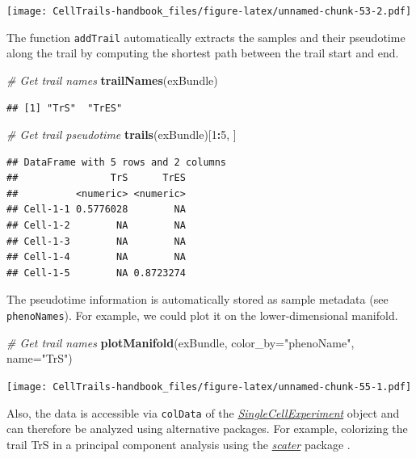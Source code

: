 \documentclass[]{book}
\newenvironment{Shaded}{\begin{snugshade}}{\end{snugshade}}
\newcommand{\KeywordTok}[1]{\textcolor[rgb]{0.13,0.29,0.53}{\textbf{#1}}}
\newcommand{\DataTypeTok}[1]{\textcolor[rgb]{0.13,0.29,0.53}{#1}}
\newcommand{\DecValTok}[1]{\textcolor[rgb]{0.00,0.00,0.81}{#1}}
\newcommand{\StringTok}[1]{\textcolor[rgb]{0.31,0.60,0.02}{#1}}
\newcommand{\CommentTok}[1]{\textcolor[rgb]{0.56,0.35,0.01}{\textit{#1}}}
\newcommand{\OperatorTok}[1]{\textcolor[rgb]{0.81,0.36,0.00}{\textbf{#1}}}
\newcommand{\NormalTok}[1]{#1}
\theoremstyle{definition}
\theoremstyle{definition}
\theoremstyle{definition}
\theoremstyle{remark}
\begin{document}
\texttt{[image: CellTrails-handbook\_files/figure-latex/unnamed-chunk-53-2.pdf]}

The function \texttt{addTrail} automatically extracts the samples and
their pseudotime along the trail by computing the shortest path between
the trail start and end.

\begin{Shaded}
\begin{Highlighting}[]
\CommentTok{# Get trail names}
\KeywordTok{trailNames}\NormalTok{(exBundle)}
\end{Highlighting}
\end{Shaded}

\begin{verbatim}
## [1] "TrS"  "TrES"
\end{verbatim}

\begin{Shaded}
\begin{Highlighting}[]
\CommentTok{# Get trail pseudotime}
\KeywordTok{trails}\NormalTok{(exBundle)[}\DecValTok{1}\OperatorTok{:}\DecValTok{5}\NormalTok{, ]}
\end{Highlighting}
\end{Shaded}

\begin{verbatim}
## DataFrame with 5 rows and 2 columns
##                TrS      TrES
##          <numeric> <numeric>
## Cell-1-1 0.5776028        NA
## Cell-1-2        NA        NA
## Cell-1-3        NA        NA
## Cell-1-4        NA        NA
## Cell-1-5        NA 0.8723274
\end{verbatim}

The pseudotime information is automatically stored as sample metadata
(see \texttt{phenoNames}). For example, we could plot it on the
lower-dimensional manifold.

\begin{Shaded}
\begin{Highlighting}[]
\CommentTok{# Get trail names}
\KeywordTok{plotManifold}\NormalTok{(exBundle, }\DataTypeTok{color_by=}\StringTok{"phenoName"}\NormalTok{, }\DataTypeTok{name=}\StringTok{"TrS"}\NormalTok{)}
\end{Highlighting}
\end{Shaded}

\texttt{[image: CellTrails-handbook\_files/figure-latex/unnamed-chunk-55-1.pdf]}

Also, the data is accessible via \texttt{colData} of the
\emph{\href{http://bioconductor.org/packages/SingleCellExperiment}{SingleCellExperiment}}
object and can therefore be analyzed using alternative packages. For
example, colorizing the trail TrS in a principal component analysis
using the \emph{\href{http://bioconductor.org/packages/scater}{scater}}
package \citep{scater}.
\end{document}
